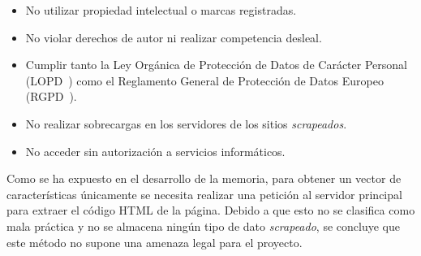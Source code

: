 \begin{itemize}
	\item No utilizar propiedad intelectual o marcas registradas.
	\item No violar derechos de autor ni realizar competencia desleal.
	\item Cumplir tanto la Ley Orgánica de Protección de Datos de Carácter Personal (LOPD~\cite{LOPD}) como el Reglamento General de Protección de Datos Europeo (RGPD~\cite{RGPD}).
	\item No realizar sobrecargas en los servidores de los sitios \textit{scrapeados}.
	\item No acceder sin autorización a servicios informáticos.
\end{itemize}

Como se ha expuesto en el desarrollo de la memoria, para obtener un vector de características únicamente se necesita realizar una petición al servidor principal para extraer el código HTML de la página. Debido a que esto no se clasifica como mala práctica y no se almacena ningún tipo de dato \textit{scrapeado}, se concluye que este método no supone una amenaza legal para el proyecto.
